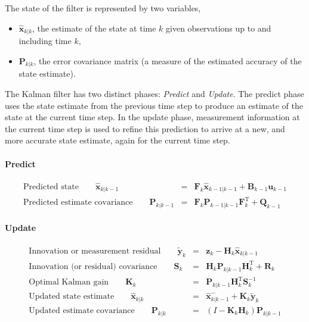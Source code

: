 The state of the filter is represented by two variables,
\begin{itemize}
\item $\hat{\textbf{x}}_{k|k}$, the estimate of the state at time $k$ given observations up to and including time $k$,
\item $\textbf{P}_{k|k}$, the error covariance matrix (a measure of the estimated accuracy of the state estimate).
\end{itemize}

The Kalman filter has two distinct phases: \emph{Predict} and \emph{Update}. The predict phase uses the state estimate from the previous time step to produce an estimate of the state at the current time step. In the update phase, measurement information at the current time step is used to refine this prediction to arrive at a new, and more accurate state estimate, again for the current time step.

\paragraph{Predict}
\begin{eqnarray*}
\text{Predicted state} \qquad \hat{\textbf{x}}_{k|k-1} &=& \textbf{F}_{k}\hat{\textbf{x}}_{k-1|k-1} + \textbf{B}_{k-1} \textbf{u}_{k-1} \\
\text{Predicted estimate covariance} \qquad \textbf{P}_{k|k-1} &=& \textbf{F}_{k} \textbf{P}_{k-1|k-1} \textbf{F}_{k}^{\text{T}} + \textbf{Q}_{k-1}
\end{eqnarray*}

\paragraph{Update}
\begin{eqnarray*}
\text{Innovation or measurement residual} \qquad \tilde{\textbf{y}}_k &=& \textbf{z}_k - \textbf{H}_k\hat{\textbf{x}}_{k|k-1} \\
\text{Innovation (or residual) covariance} \qquad \textbf{S}_k &=& \textbf{H}_k \textbf{P}_{k|k-1} \textbf{H}_k^\text{T} + \textbf{R}_k \\
\text{Optimal Kalman gain} \qquad \textbf{K}_k &=& \textbf{P}_{k|k-1}\textbf{H}_k^\text{T}\textbf{S}_k^{-1} \\
\text{Updated state estimate} \qquad \hat{\textbf{x}}_{k|k} &=& \hat{\textbf{x}}^{-}_{k|k-1} + \textbf{K}_k\tilde{\textbf{y}}_k \\
\text{Updated estimate covariance} \qquad \textbf{P}_{k|k} &=& (I - \textbf{K}_k \textbf{H}_k) \textbf{P}_{k|k-1} \\
\end{eqnarray*}


